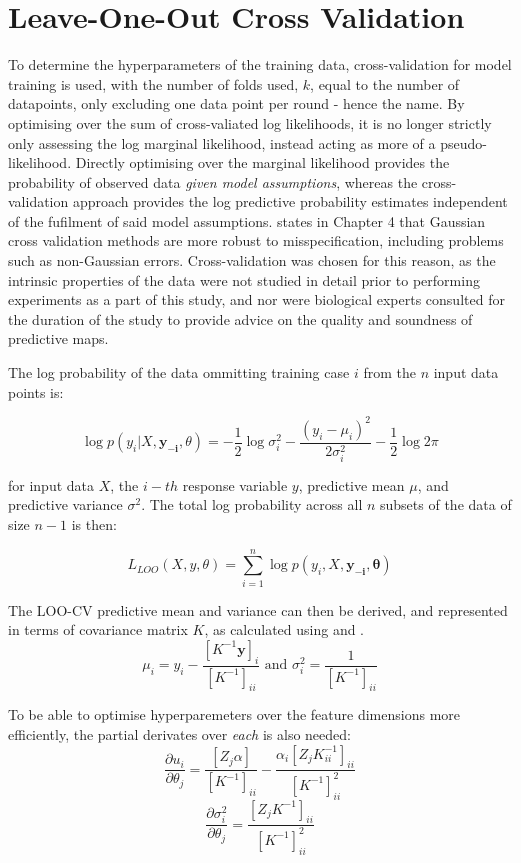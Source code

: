 \section{Leave-One-Out Cross Validation}

To determine the hyperparameters of the training data, cross-validation for model training is used, with the number of folds used, $k$, equal to the number of datapoints, only excluding one data point per round - hence the name. By optimising over the sum of cross-valiated log likelihoods, it is no longer strictly only assessing the log marginal likelihood, instead acting as more of a pseudo-likelihood. Directly optimising over the marginal likelihood provides the probability of observed data \textit{given model assumptions}, whereas the cross-validation approach provides the log predictive probability estimates independent of the fufilment of said model assumptions. \citep{wahba90} states in Chapter 4 that Gaussian cross validation methods are more robust to misspecification, including problems such as non-Gaussian errors. Cross-validation was chosen for this reason, as the intrinsic properties of the data were not studied in detail prior to performing experiments as a part of this study, and nor were biological experts consulted for the duration of the study to provide advice on the quality and soundness of predictive maps.

The log probability of the data ommitting training case $i$ from the $n$ input data points is:

$$\log p(y_i|X, \mathbf{y_{-i}}, \theta) = -\frac{1}{2}\log\sigma^2_i - \frac{(y_i - \mu_i)^2}{2 \sigma^2_i} - \frac{1}{2}\log2\pi$$

for input data $X$, the $i-th$ response variable $y$, predictive mean $\mu$, and predictive variance $\sigma^2$. The total log probability across all $n$ subsets of the data of size $n-1$ is then:

$$ L_{LOO}(X, y, \theta) = \sum^n_{i=1} \log p(y_i, X, \mathbf{y_{-i}}, \mathbf{\theta})$$

The LOO-CV predictive mean and variance can then be derived, and represented in terms of covariance matrix $K$, as calculated using  and .
$$\mu_i= y_i - \frac{[K^{-1}\mathbf{y}]_i}{[K^{-1}]_{ii}} \text{ and } \sigma_i^2 = \frac{1}{[K^{-1}]_{ii}}$$

To be able to optimise hyperparemeters over the feature dimensions more efficiently, the partial derivates over \textit{each} is also needed:
$$\frac{\partial{u_i}}{\partial{\theta_j}} = \frac{[Z_j \alpha]}{[K^{-1}]_{ii}} - \frac{\alpha_i[Z_j K^{-1}_{ii}]_{ii}}{[K^{-1}]^2_{ii}}$$
$$\frac{\partial{\sigma_i^2}}{\partial{\theta_j}} = \frac{[Z_jK^{-1}]_{ii}}{[K^{-1}]^2_{ii}}$$

